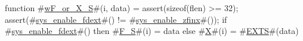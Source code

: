 function #\hyperref[sailRISCVzwFzyorzyXzyS]{wF\_or\_X\_S}#(i, data) = {
  assert(sizeof(flen) >= 32);
  assert(#\hyperref[sailRISCVzsyszyenablezyfdext]{sys\_enable\_fdext}#() != #\hyperref[sailRISCVzsyszyenablezyzzfinx]{sys\_enable\_zfinx}#());
  if   #\hyperref[sailRISCVzsyszyenablezyfdext]{sys\_enable\_fdext}#()
  then #\hyperref[sailRISCVzFzyS]{F\_S}#(i) = data
  else #\hyperref[sailRISCVzX]{X}#(i) = #\hyperref[sailRISCVzEXTS]{EXTS}#(data)
}
